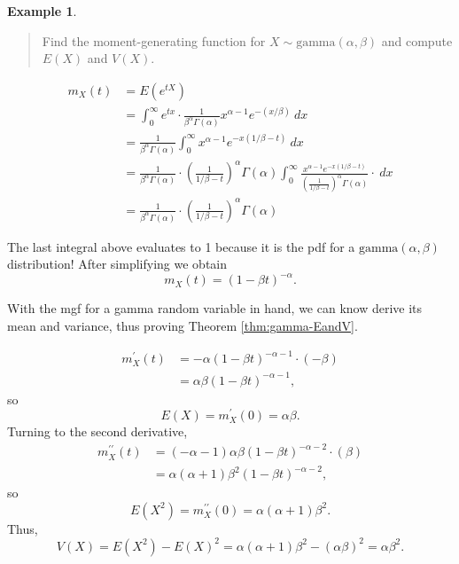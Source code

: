 \documentclass[
]{book}
\theoremstyle{definition}
\theoremstyle{definition}
\newtheorem{example}{Example}[chapter]
\theoremstyle{definition}
\theoremstyle{definition}
\theoremstyle{remark}
\begin{document}
\begin{example}
\leavevmode

\begin{quote}
Find the moment-generating function for \(X \sim \text{gamma}(\alpha,\beta)\) and compute \(E(X)\) and \(V(X)\).
\end{quote}

\begin{align*}
m_X(t) &= E(e^{tX})\\
        &= \int_{0}^{\infty} e^{tx} \cdot \frac{1}{\beta^\alpha \Gamma(\alpha)}x^{\alpha-1}e^{-(x/\beta)}~dx\\
        &= \frac{1}{\beta^\alpha \Gamma(\alpha)} \int_{0}^{\infty} x^{\alpha - 1}e^{-x(1/\beta-t)}~dx\\
        &= \frac{1}{\beta^\alpha \Gamma(\alpha)} \cdot \left(\frac{1}{1/\beta - t}\right)^\alpha \Gamma(\alpha) \int_{0}^{\infty} \frac{x^{\alpha - 1}e^{-x(1/\beta-t)}}{\left(\frac{1}{1/\beta - t}\right)^\alpha \Gamma(\alpha)}\cdot ~dx\\
        &= \frac{1}{\beta^\alpha \Gamma(\alpha)} \cdot \left(\frac{1}{1/\beta - t}\right)^\alpha \Gamma(\alpha) 
\end{align*}

The last integral above evaluates to 1 because it is the pdf for a \(\text{gamma}(\alpha,\beta)\) distribution! After simplifying we obtain \[m_X(t) = (1-\beta t)^{-\alpha}.\]

With the mgf for a gamma random variable in hand, we can know derive its mean and variance, thus proving Theorem \ref{thm:gamma-EandV}.

\begin{align*}
m_X^\prime(t) &= -\alpha(1-\beta t)^{-\alpha-1}\cdot(-\beta) \\
              &= \alpha\beta(1-\beta t)^{-\alpha-1},
\end{align*}
so
\[E(X) = m_X^\prime(0) = \alpha\beta.\]
Turning to the second derivative,
\begin{align*}
m_X^{\prime\prime}(t) &= (-\alpha-1)\alpha\beta(1-\beta t)^{-\alpha-2}\cdot(\beta)\\
&= \alpha(\alpha+1)\beta^2(1-\beta t)^{-\alpha-2},
\end{align*}
so
\[E(X^2) = m_X^{\prime\prime}(0) = \alpha(\alpha+1)\beta^2.\]
Thus,
\[V(X) = E(X^2)-E(X)^2 = \alpha(\alpha+1)\beta^2 - (\alpha\beta)^2  = \alpha\beta^2.\]

\end{example}
\end{document}
